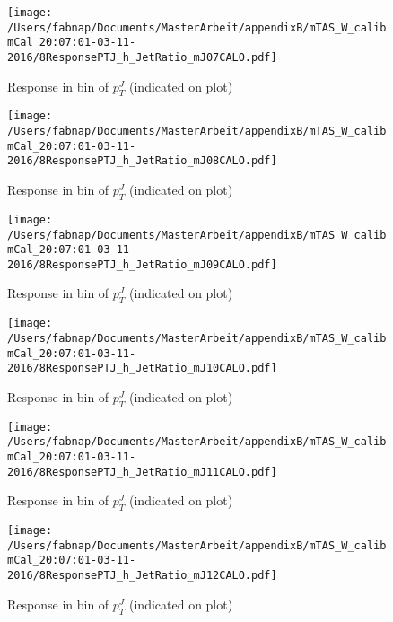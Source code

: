 \begin{figure}

\texttt{[image: /Users/fabnap/Documents/MasterArbeit/appendixB/mTAS\_W\_calibmCal\_20:07:01-03-11-2016/8ResponsePTJ\_h\_JetRatio\_mJ07CALO.pdf]}
\caption{Response in bin of  $p_{T}^{J}$ (indicated on plot)} 

\end{figure}

\clearpage

\begin{figure}

\texttt{[image: /Users/fabnap/Documents/MasterArbeit/appendixB/mTAS\_W\_calibmCal\_20:07:01-03-11-2016/8ResponsePTJ\_h\_JetRatio\_mJ08CALO.pdf]}
\caption{Response in bin of  $p_{T}^{J}$ (indicated on plot)} 

\end{figure}

\begin{figure}

\texttt{[image: /Users/fabnap/Documents/MasterArbeit/appendixB/mTAS\_W\_calibmCal\_20:07:01-03-11-2016/8ResponsePTJ\_h\_JetRatio\_mJ09CALO.pdf]}
\caption{Response in bin of  $p_{T}^{J}$ (indicated on plot)} 

\end{figure}

\begin{figure}

\texttt{[image: /Users/fabnap/Documents/MasterArbeit/appendixB/mTAS\_W\_calibmCal\_20:07:01-03-11-2016/8ResponsePTJ\_h\_JetRatio\_mJ10CALO.pdf]}
\caption{Response in bin of  $p_{T}^{J}$ (indicated on plot)} 

\end{figure}

\begin{figure}

\texttt{[image: /Users/fabnap/Documents/MasterArbeit/appendixB/mTAS\_W\_calibmCal\_20:07:01-03-11-2016/8ResponsePTJ\_h\_JetRatio\_mJ11CALO.pdf]}
\caption{Response in bin of  $p_{T}^{J}$ (indicated on plot)} 

\end{figure}

\begin{figure}

\texttt{[image: /Users/fabnap/Documents/MasterArbeit/appendixB/mTAS\_W\_calibmCal\_20:07:01-03-11-2016/8ResponsePTJ\_h\_JetRatio\_mJ12CALO.pdf]}
\caption{Response in bin of  $p_{T}^{J}$ (indicated on plot)} 

\end{figure}
